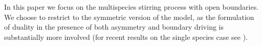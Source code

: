\documentclass[10pt]{article}
\numberwithin{equation}{section}
\numberwithin{equation}{subsection}
\begin{document}
In this paper we focus on the multispecies stirring process with open boundaries.
We choose to restrict to the symmetric version of the model, as the formulation
of duality in the presence of both asymmetry and boundary driving is substantially
more involved (for recent results on the single species case see
\cite{schuetz2022reverse,barraquand2022markov}).


 

 




 
\end{document}
